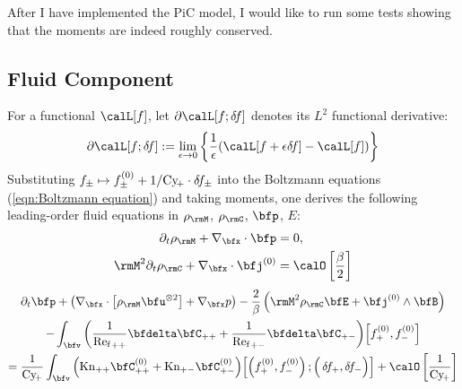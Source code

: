     \begin{remark}
        After I have implemented the PiC model, I would like to run some tests showing that the moments are indeed roughly conserved.
    \end{remark}

    \line

    \subsection*{Fluid Component}
        For a functional $\calL[f]$, let $\partial\calL[f; \delta\!f]$ denotes its $L^{2}$ functional derivative:
        \begin{equation}
            \partial\calL[f; \delta\!f]  :=  \lim_{\epsilon \rightarrow 0}\left\{\frac{1}{\epsilon}(\calL[f + \epsilon\delta\!f] - \calL[f])\right\}
        \end{equation}
        Substituting $f_{\pm}  \mapsto  f_{\pm}^{(0)} + 1/\mathrm{Cy}\!_{+}\cdot\delta\!f_{\pm}$ into the Boltzmann equations (\ref{eqn:Boltzmann equation}) and taking moments, one derives the following leading-order fluid equations in $\rho_{\rmM}$, $\rho_{\rmC}$, $\bfp$, $E$:
        \begin{align}
            \partial_{t}\rho_{\rmM} + \nabla_{\bfx}\cdot\bfp  &=  0,  \label{eqn:PiC-coupled mass conservation}  \\
            \rmM^{2}\partial_{t}\rho_{\rmC} + \nabla_{\bfx}\cdot\bfj^{(0)}  &=  \calO\left[\frac{\beta}{2}\right]  \label{eqn:PiC-coupled charge conservation}
        \end{align}
        \vspace{-20pt}
        \begin{multline}
            \partial_{t}\bfp + \left(\nabla_{\bfx}\cdot\left[\rho_{\rmM}\bfu^{\otimes 2}\right] + \nabla_{\bfx}p\right) - \frac{2}{\beta}\left(\rmM^{2}\rho_{\rmC}\bfE + \bfj^{(0)}\wedge\bfB\right) \\
            - \int_{\bfv}\left(\frac{1}{{\rmRef}_{++}}\bfdelta\bfC_{++} + \frac{1}{{\rmRef}_{+-}}\bfdelta\bfC_{+-}\right)\!\left[f_{+}^{(0)}, f_{-}^{(0)}\right]  \\
            =  \frac{1}{\rmCy\!_{+}}\int_{\bfv}\left(\rmKn_{++}\bfC_{++}^{(0)} + \rmKn_{+-}\bfC_{+-}^{(0)}\right)\!\left[\left(f_{+}^{(0)}, f_{-}^{(0)}\right); \left({\color{white} f_{+}^{(0)}}\!\!\!\!\!\!\!\!\!\delta\!f_{+}, \delta\!f_{-}\right)\right] + \calO\left[\frac{1}{\rmCy\!_{+}}\right]
        \end{multline}
